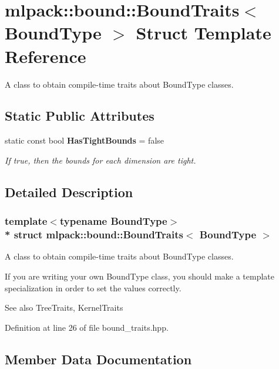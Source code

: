 \section{mlpack\+:\+:bound\+:\+:Bound\+Traits$<$ Bound\+Type $>$ Struct Template Reference}
\label{structmlpack_1_1bound_1_1BoundTraits}


A class to obtain compile-\/time traits about Bound\+Type classes.  


\subsection*{Static Public Attributes}
\begin{DoxyCompactItemize}
\item 
static const bool {\bf Has\+Tight\+Bounds} = false
\begin{DoxyCompactList}\small\item\em If true, then the bounds for each dimension are tight. \end{DoxyCompactList}\end{DoxyCompactItemize}


\subsection{Detailed Description}
\subsubsection*{template$<$typename Bound\+Type$>$\\*
struct mlpack\+::bound\+::\+Bound\+Traits$<$ Bound\+Type $>$}

A class to obtain compile-\/time traits about Bound\+Type classes. 

If you are writing your own Bound\+Type class, you should make a template specialization in order to set the values correctly.

\begin{DoxySeeAlso}{See also}
Tree\+Traits, Kernel\+Traits 
\end{DoxySeeAlso}


Definition at line 26 of file bound\+\_\+traits.\+hpp.



\subsection{Member Data Documentation}
